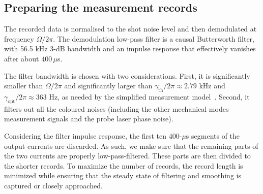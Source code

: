 \documentclass[./Main-revtex.tex]{subfiles}
\begin{document}

\subsection{Preparing the measurement records}\label{sec:RecordPrep}

The recorded data is normalised to the shot noise level and then demodulated at frequency $\Omega/2\pi$. The demodulation low-pass filter is a causal Butterworth filter, with 56.5 kHz 3-dB bandwidth and an impulse response that effectively vanishes after about $400\,\mu$s.

The filter bandwidth is chosen with two considerations. First, it is significantly smaller than $\Omega/2\pi$ and significantly larger than $\gamma_\text{th}/2\pi\approx2.79$ kHz and $\gamma_\text{opt}/2\pi\approx363$ Hz, as needed by the simplified measurement model~\cite{doherty2012quantum}. Second, it filters out all the coloured noises (including the other mechanical modes measurement signals and the probe laser phase noise).

Considering the filter impulse response, the first ten $400$-$\mu$s segments of the output currents are discarded. As such, we make sure that the remaining parts of the two currents are properly low-pass-filtered. These parts are then divided to the shorter records. To maximize the number of records, the record length is minimized while ensuring that the steady state of filtering and smoothing is captured or closely approached.
\end{document}
